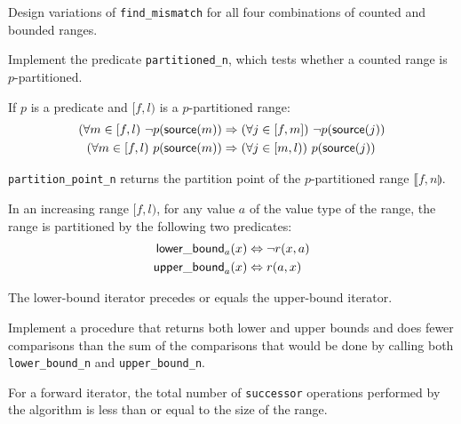 \begin{exercise}
	Design variations of \verb|find_mismatch| for all four combinations of counted
	and bounded ranges.
\end{exercise}



\begin{exercise}
	Implement the predicate \verb|partitioned_n|, which tests whether a counted
	range is $p$-partitioned.
\end{exercise}



\begin{lemma}
	If $p$ is a predicate and $[f, l)$ is a $p$-partitioned range:
	\begin{align*}
		(\forall m \in [f, l)\ \lnot p(\mathsf{source}(m)) &\Rightarrow (\forall j \in [f, m])\ \lnot p(\mathsf{source}(j))\\
		(\forall m \in [f, l)\ p(\mathsf{source}(m)) &\Rightarrow (\forall j \in [m, l))\ p(\mathsf{source}(j))
	\end{align*}
\end{lemma}

\begin{lemma}
	\verb|partition_point_n| returns the partition point of the $p$-partitioned range
	$\llbracket f, n \rrparenthesis$.
\end{lemma}

\begin{lemma}
	In an increasing range $[f, l)$, for any value $a$ of the value type of the range,
	the range is partitioned by the following two predicates:
	\begin{align*}
		\mathsf{lower\_bound}_a(x) &\Leftrightarrow \lnot r(x, a)\\
		\mathsf{upper\_bound}_a(x) &\Leftrightarrow r(a, x)
	\end{align*}
\end{lemma}

\begin{lemma}
	The lower-bound iterator precedes or equals the upper-bound iterator.
\end{lemma}

\begin{exercise}
	Implement a procedure that returns both lower and upper bounds and does fewer
	comparisons than the sum of the comparisons that would be done by calling both
	\verb|lower_bound_n| and \verb|upper_bound_n|.
\end{exercise}



\begin{lemma}
	For a forward iterator, the total number of \verb|successor| operations
	performed by the algorithm is less than or equal to the size of the range.
\end{lemma}
